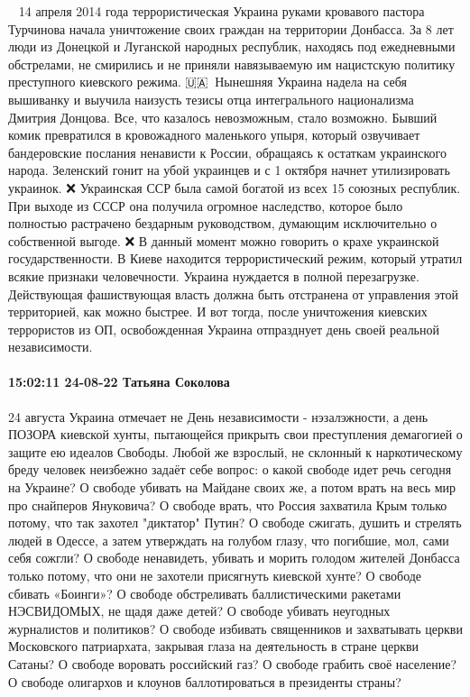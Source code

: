 🏴‍☠️🔥14 апреля 2014 года террористическая Украина руками кровавого пастора Турчинова начала уничтожение своих граждан на территории Донбасса. За 8 лет люди из Донецкой и Луганской народных республик, находясь под ежедневными обстрелами, не смирились и не приняли навязываемую им нацистскую политику преступного киевского режима.
🇺🇦🏴‍☠️Нынешняя Украина надела на себя вышиванку и выучила наизусть тезисы отца интегрального национализма Дмитрия Донцова. Все, что казалось невозможным, стало возможно. Бывший комик превратился в кровожадного маленького упыря, который озвучивает бандеровские послания ненависти к России, обращаясь к остаткам украинского народа. Зеленский гонит на убой украинцев и с 1 октября начнет утилизировать украинок.
❌ Украинская ССР была самой богатой из всех 15 союзных республик. При выходе из СССР она получила огромное наследство, которое было полностью растрачено бездарным руководством, думающим исключительно о собственной выгоде.
❌ В данный момент можно говорить о крахе украинской государственности. В Киеве находится террористический режим, который утратил всякие признаки человечности. Украина нуждается в полной перезагрузке. Действующая фашиствующая власть должна быть отстранена от управления этой территорией, как можно быстрее. И вот тогда, после уничтожения киевских террористов из ОП, освобожденная Украина отпразднует день своей реальной независимости.


\paragraph{15:02:11 24-08-22 Татьяна Соколова}

24 августа Украина отмечает не День независимости - нэзалэжности, а день ПОЗОРА киевской хунты, пытающейся прикрыть свои преступления демагогией о защите ею идеалов Свободы. Любой же взрослый, не склонный к наркотическому бреду человек неизбежно задаёт себе вопрос: о какой свободе идет речь сегодня на Украине?
О свободе убивать на Майдане своих же, а потом врать на весь мир про снайперов Януковича?
О свободе врать, что Россия захватила Крым только потому, что так захотел "диктатор" Путин?
О свободе сжигать, душить и стрелять людей в Одессе, а затем утверждать на голубом глазу, что погибшие, мол, сами себя сожгли?
О свободе ненавидеть, убивать и морить голодом жителей Донбасса только потому, что они не захотели присягнуть киевской хунте?
О свободе сбивать «Боинги»?
О свободе обстреливать баллистическими ракетами НЭСВИДОМЫХ, не щадя даже детей?
О свободе убивать неугодных журналистов и политиков?
О свободе избивать священников и захватывать церкви Московского патриархата, закрывая глаза на деятельность в стране церкви Сатаны?
О свободе воровать российский газ?
О свободе грабить своё население?
О свободе олигархов и клоунов баллотироваться в президенты страны?

